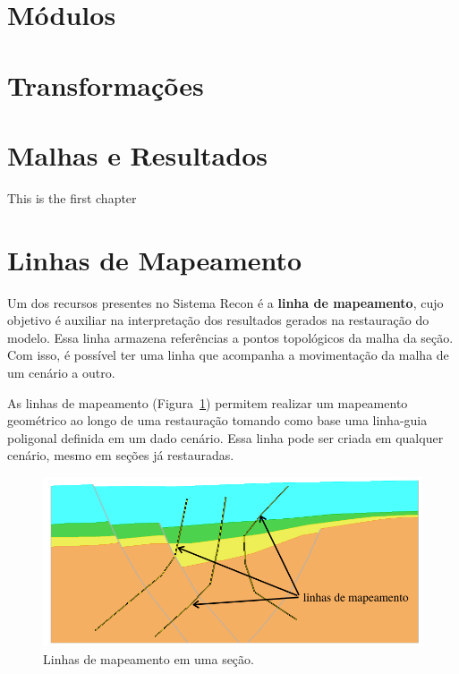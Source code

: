 \section{Módulos}

\section{Transformações}

\section{Malhas e Resultados}

This is the first chapter

\section{Linhas de Mapeamento}

Um dos recursos presentes no Sistema Recon é a \textbf{linha de mapeamento}, cujo objetivo é auxiliar na interpretação dos resultados gerados na restauração do modelo. Essa linha armazena referências a pontos topológicos da malha da seção. Com isso, é possível ter uma linha que acompanha a movimentação da malha de um cenário a outro.

As linhas de mapeamento (Figura~\ref{fig-linemap}) permitem realizar um mapeamento geométrico ao longo de uma restauração tomando como base uma linha-guia poligonal definida em um dado cenário. Essa linha pode ser criada em qualquer cenário, mesmo em seções já restauradas.

\begin{figure} [h]
  \begin{center}
    \includegraphics[width=400pt]{images/fig-linhas-de-mapeamento-ed}
    \caption{Linhas de mapeamento em uma seção.}\label{fig-linemap}
  \end{center}
\end{figure}

